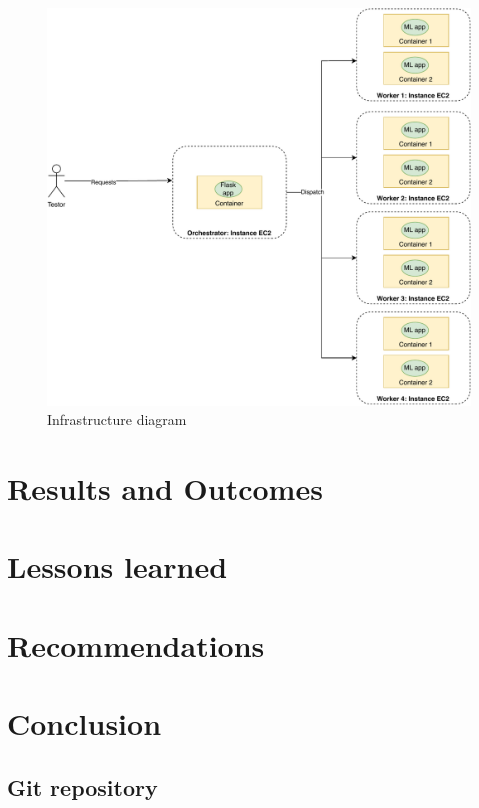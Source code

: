 \documentclass[letterpaper,headings=standardclasses,parskip=half]{scrartcl}
\newcommand{\todo}{{\color{red}{TODO}}}
\begin{document}
\begin{figure}
    \centering
    \includegraphics[width=\textwidth]{../report/images/infra.pdf}
    \caption{Infrastructure diagram}
    \label{fig:infra}
\end{figure}


\section{Results and Outcomes}

\todo

\section{Lessons learned}

\todo

\section{Recommendations}

\todo

\section{Conclusion}

\todo


\subsection*{Git repository}
\end{document}
